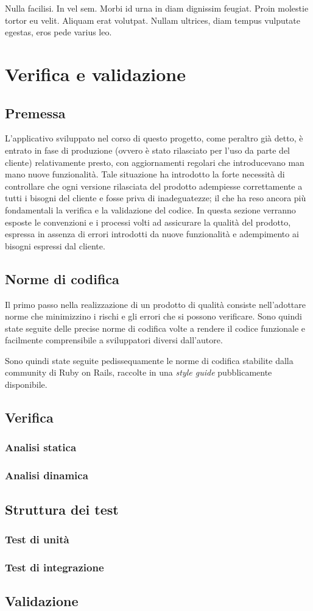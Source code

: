 
\begin{savequote}[75mm]
Nulla facilisi. In vel sem. Morbi id urna in diam dignissim feugiat. Proin molestie tortor eu velit. Aliquam erat volutpat. Nullam ultrices, diam tempus vulputate egestas, eros pede varius leo.
\end{savequote}

\chapter{Verifica e validazione}
\section{Premessa}
L'applicativo sviluppato nel corso di questo progetto, come peraltro già detto, è entrato in fase di produzione (ovvero è stato rilasciato per l'uso da parte del cliente) relativamente presto, con aggiornamenti regolari che introducevano man mano nuove funzionalità. Tale situazione ha introdotto la forte necessità di controllare che ogni versione rilasciata del prodotto adempiesse correttamente a tutti i bisogni del cliente e fosse priva di inadeguatezze; il che ha reso ancora più fondamentali la verifica e la validazione del codice. In questa sezione verranno esposte le convenzioni e i processi volti ad assicurare la qualità del prodotto, espressa in assenza di errori introdotti da nuove funzionalità e adempimento ai bisogni espressi dal cliente.
\section{Norme di codifica}
Il primo passo nella realizzazione di un prodotto di qualità consiste nell'adottare norme che minimizzino i rischi e gli errori che si possono verificare. Sono quindi state seguite delle precise norme di codifica volte a rendere il codice funzionale e facilmente comprensibile a sviluppatori diversi dall'autore.

Sono quindi state seguite pedissequamente le norme di codifica stabilite dalla community di Ruby on Rails, raccolte in una \textit{style guide} pubblicamente disponibile.
\section{Verifica}
\subsection{Analisi statica}
\subsection{Analisi dinamica}
\section{Struttura dei test}
\subsection{Test di unità}
\subsection{Test di integrazione}
\section{Validazione}


